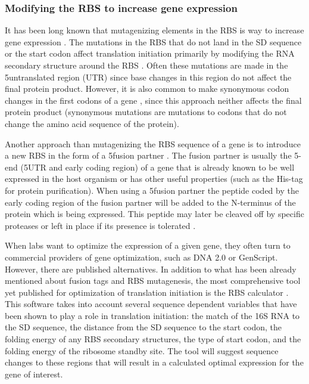 \subsubsection{Modifying the RBS to increase gene expression}
It has been long known that mutagenizing elements in the RBS is way to increase
gene expression \cite{warburton_increased_1983}. The mutations in the RBS that
do not land in the SD sequence or the start codon affect translation
initiation primarily by modifying the RNA secondary structure around the RBS
\cite{park_design_2007, care_translation_2007}. Often these mutations are made
in the 5\p untranslated region (UTR) since base changes in this region do not
affect the final protein product. However, it is also common to make synonymous
codon changes in the first codons of a gene \cite{cebe_rapid_2006}, since this
approach neither affects the final protein product (synonymous mutations are
mutations to codons that do not change the amino acid sequence of the protein).

Another approach than mutagenizing the RBS sequence of a gene is to introduce a
new RBS in the form of a 5\p fusion partner \cite{lavallie_gene_1995}. The
fusion partner is usually the 5\p-end (5\p UTR and early coding region) of a
gene that is already known to be well expressed in the host organism or has
other useful properties (such as the His-tag for protein purification). When
using a 5\p fusion partner the peptide coded by the early coding region of the
fusion partner will be added to the N-terminus of the protein which is being
expressed. This peptide may later be cleaved off by specific proteases or left
in place if its presence is tolerated \cite{esposito_enhancement_2006}.

When labs want to optimize the expression of a given gene, they often turn to
commercial providers of gene optimization, such as DNA 2.0 or GenScript.
However, there are published alternatives. In addition to what has been already
mentioned about fusion tags and RBS mutagenesis, the most comprehensive tool
yet published for optimization of translation initiation is the RBS calculator
\cite{salis_automated_2009}. This software takes into account several sequence
dependent variables that have been shown to play a role in translation
initiation: the match of the 16S RNA to the SD sequence, the distance from the
SD sequence to the start codon, the folding energy of any RBS secondary
structures, the type of start codon, and the folding energy of the ribosome
standby site. The tool will suggest sequence changes to these regions that will
result in a calculated optimal expression for the gene of interest.

